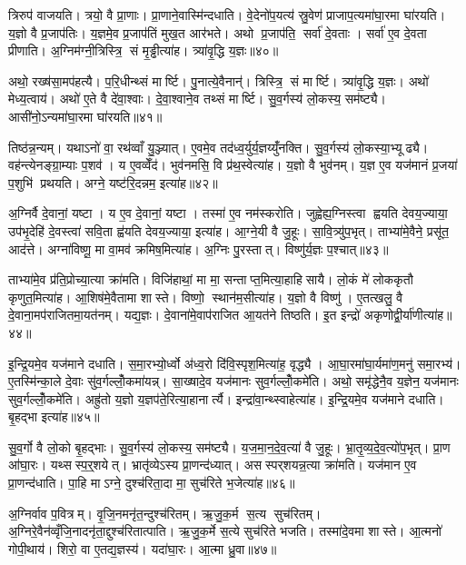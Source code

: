 त्रिरुप॑ वाजयति। त्रयो॒ वै प्रा॒णाः। प्रा॒णाने॒वास्मि॑न्दधाति। वे॒देनो॑प॒यत्य॑ स्रु॒वेण॑ प्राजाप॒त्यमा॑घा॒रमा घा॑रयति। य॒ज्ञो वै प्र॒जाप॑तिः। य॒ज्ञमे॒व प्र॒जाप॑तिं मुख॒त आर॑भते। अथो प्र॒जाप॑ति॒ सर्वा॑ दे॒वताः। सर्वा॑ ए॒व दे॒वता प्रीणाति। अ॒ग्निम॑ग्नी॒त्रिस्त्रि॒ सं मृ॒ड्ढीत्या॑ह। त्र्या॑वृ॒द्धि य॒ज्ञः॥४०॥

अथो॒ रख्ष॑सा॒मप॑हत्यै। प॒रि॒धीन्थ्सं मार्ष्टि। पु॒नात्ये॒वैनान्॑। त्रिस्त्रि॒ सं मार्ष्टि। त्र्या॑वृ॒द्धि य॒ज्ञः। अथो॑ मेध्य॒त्वाय॑। अथो॑ ए॒ते वै दे॑वा॒श्वाः। दे॒वा॒श्वाने॒व तथ्सं मार्ष्टि। सु॒व॒र्गस्य॑ लो॒कस्य॒ सम॑ष्ट्यै। आसी॑नो॒ऽन्यमा॑घा॒रमा घा॑रयति॥४१॥

तिष्ठ॑न्न॒न्यम्। यथाऽनो॑ वा॒ रथ॑व्वाँ यु॒ञ्ज्यात्। ए॒वमे॒व तद॑ध्व॒र्युर्य॒ज्ञय्युँ॑नक्ति। सु॒व॒र्गस्य॑ लो॒कस्या॒भ्यूढ्यै। वह॑न्त्येनङ्ग्रा॒म्याः प॒शव॑। य ए॒वव्वेँद॑। भुव॑नमसि॒ वि प्र॑थ॒स्वेत्या॑ह। य॒ज्ञो वै भुव॑नम्। य॒ज्ञ ए॒व यज॑मानं प्र॒जया॑ प॒शुभि॑ प्रथयति। अग्ने॒ यष्ट॑रि॒दन्नम॒ इत्या॑ह॥४२॥

अ॒ग्निर्वै दे॒वानां॒ यष्टा। य ए॒व दे॒वानां॒ यष्टा। तस्मा॑ ए॒व नम॑स्करोति। जुह्वेह्य॒ग्निस्त्वा ह्वयति देवय॒ज्याया॒ उप॑भृ॒देहि॑ दे॒वस्त्वा॑ सवि॒ता ह्व॑यति देवय॒ज्याया॒ इत्या॑ह। आ॒ग्ने॒यी वै जु॒हूः। सा॒वि॒त्र्यु॑प॒भृत्। ताभ्या॑मे॒वैने॒ प्रसू॑त॒ आद॑त्ते। अग्ना॑विष्णू॒ मा वा॒मव॑ क्रमिष॒मित्या॑ह। अ॒ग्निः पु॒रस्तात्। विष्णु॑र्य॒ज्ञः प॒श्चात्॥४३॥

ताभ्या॑मे॒व प्र॑ति॒प्रोच्या॒त्या क्रा॑मति। विजि॑हाथां॒ मा मा॒ सन्ताप्त॒मित्या॒हाहिसायै। लो॒कं मे॑ लोककृतौ कृणुत॒मित्या॑ह। आ॒शिष॑मे॒वैतामा शास्ते। विष्णो॒ स्थान॑म॒सीत्या॑ह। य॒ज्ञो वै विष्णु॑। ए॒तत्खलु॒ वै दे॒वाना॒मप॑राजितमा॒यत॑नम्। यद्य॒ज्ञः। दे॒वाना॑मे॒वाप॑राजित आ॒यत॑ने तिष्ठति। इ॒त इन्द्रो॑ अकृणोद्वी॒र्या॑णीत्या॑ह॥४४॥

इ॒न्द्रि॒यमे॒व यज॑माने दधाति। स॒मा॒रभ्यो॒र्ध्वो अ॑ध्व॒रो दि॑वि॒स्पृश॒मित्या॑ह॒ वृद्ध्यै। आ॒घा॒रमा॑घा॒र्यमा॑ण॒मनु॑ समा॒रभ्य॑। ए॒तस्मि॑न्का॒ले दे॒वाः सु॑व॒र्गल्लोँ॒कमा॑यन्न्। सा॒ख्षादे॒व यज॑मानः सुव॒र्गल्लोँ॒कमे॑ति। अथो॒ समृ॑द्धेनै॒व य॒ज्ञेन॒ यज॑मानः सुव॒र्गल्लोँ॒कमे॑ति। अह्रु॑तो य॒ज्ञो य॒ज्ञप॑ते॒रित्या॒हानार्त्यै। इन्द्रा॑वा॒न्थ्स्वाहेत्या॑ह। इ॒न्द्रि॒यमे॒व यज॑माने दधाति। बृ॒हद्भा इत्या॑ह॥४५॥

सु॒व॒र्गो वै लो॒को बृ॒हद्भाः। सु॒व॒र्गस्य॑ लो॒कस्य॒ सम॑ष्ट्यै। य॒ज॒मा॒न॒दे॒व॒त्या॑ वै जु॒हूः। भ्रा॒तृ॒व्य॒दे॒व॒त्यो॑प॒भृत्। प्रा॒ण आ॑घा॒रः। यथ्सस्प॒र्॒शयेत्। भ्रातृ॑व्येऽस्य प्रा॒णन्द॑ध्यात्। असस्पर्‌शयन्न॒त्या क्रा॑मति। यज॑मान ए॒व प्रा॒णन्द॑धाति। पा॒हि माऽग्ने॒ दुश्च॑रिता॒दा मा॒ सुच॑रिते भ॒जेत्या॑ह॥४६॥

अ॒ग्निर्वाव प॒वित्रम्। वृ॒जि॒नमनृ॑त॒न्दुश्च॑रितम्। ऋ॒जु॒क॒र्म स॒त्य सुच॑रितम्। अ॒ग्निरे॒वैन॑व्वृँजि॒नादनृ॑ता॒द्दुश्च॑रितात्पाति। ऋ॒जु॒क॒र्मे स॒त्ये सुच॑रिते भजति। तस्मा॑दे॒वमा शास्ते। आ॒त्मनो॑ गोपी॒थाय॑। शिरो॒ वा ए॒तद्य॒ज्ञस्य॑। यदा॑घा॒रः। आ॒त्मा ध्रु॒वा॥४७॥

